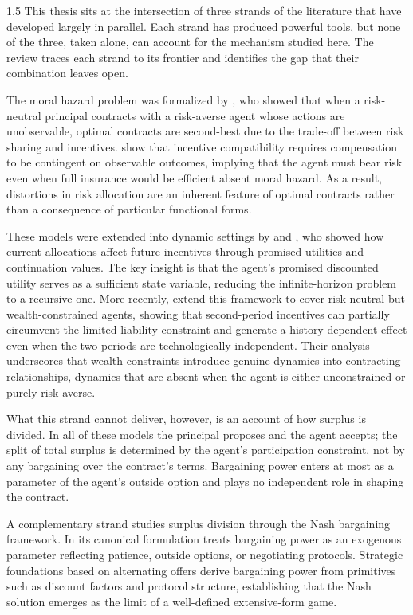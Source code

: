 \documentclass[12pt]{article}
\theoremstyle{definition}
\theoremstyle{plain}
\begin{document}
\begin{spacing}{1.5}
This thesis sits at the intersection of three strands of the literature that have developed  largely in parallel. Each strand has produced powerful tools, but none of the three, taken alone, can account for the mechanism studied here. The review traces each strand to its frontier and identifies the gap that their combination leaves open.

The moral hazard problem was formalized by \textcite{holmstrom1979}, who showed that when a risk-neutral principal contracts with a risk-averse agent whose actions are unobservable, optimal contracts are second-best due to the trade-off between risk sharing  and incentives. \textcite{grossman1983} show that incentive compatibility requires compensation to be contingent on observable outcomes, implying that the agent must bear risk even when full insurance would be efficient absent moral hazard. As a result, distortions in risk allocation are an inherent feature of optimal contracts rather than a consequence of particular functional forms.

These models were extended into dynamic settings by \textcite{spear1987} and  \textcite{thomas1990}, who showed how current allocations affect future incentives through promised utilities and continuation values. The key insight is that the agent's promised  discounted utility serves as a sufficient state variable, reducing the infinite-horizon  problem to a recursive one. More recently, \textcite{ohlendorf2008} extend this framework  to cover risk-neutral but wealth-constrained agents, showing that second-period incentives  can partially circumvent the limited liability constraint and generate a history-dependent effect even when the two periods are technologically independent. Their analysis underscores that wealth constraints introduce genuine dynamics into contracting relationships, dynamics that are absent when the agent is either unconstrained or purely risk-averse.

What this strand cannot deliver, however, is an account of how surplus is divided. In all of these models the principal proposes and the agent accepts; the split of total surplus is determined by the agent's participation constraint, not by any bargaining over the contract's terms. Bargaining power enters at most as a parameter of the agent's outside option and plays no independent role in shaping the contract.

A complementary strand studies surplus division through the Nash bargaining framework. In its canonical formulation \textcite{nash1950} treats bargaining power as an exogenous parameter reflecting patience, outside options, or negotiating protocols. Strategic foundations based on alternating offers \parencite{rubinstein1982, binmore1986} derive bargaining power from primitives such as discount factors and protocol structure, establishing that the Nash solution emerges as the limit of a well-defined extensive-form game.


\end{spacing}
\end{document}
